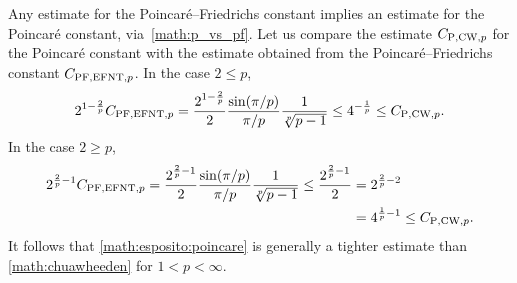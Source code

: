 \documentclass[10pt,letterpaper]{article}
\begin{document}
\begin{remark}
    Any estimate for the Poincar\'e--Friedrichs constant implies an estimate for the Poincar\'e constant, via~\eqref{math:p_vs_pf}. 
    Let us compare the estimate $C_{{\rm P},{\rm CW},p}$ for the Poincar\'e constant
    with the estimate obtained from the Poincar\'e--Friedrichs constant $C_{{\rm PF},{\rm EFNT},p}$. 
    In the case $2 \leq p$, 
    \begin{align*}
        2^{1-\frac 2 p}
        C_{{\rm PF},{\rm EFNT},p}
        =
        \frac{ 2^{1-\frac 2 p} }{2}
        \frac{ \sin(\pi/p) }{ \pi/p }
        \frac{ 1 }{ \sqrt[p]{p-1} }
        \leq 
        4^{-\frac 1 p}
        \leq
        C_{{\rm P},{\rm CW},p} 
        .
    \end{align*}
    In the case $2 \geq p$, 
    \begin{align*}
        2^{\frac 2 p - 1}
        C_{{\rm PF},{\rm EFNT},p}
        =
        \frac{ 2^{\frac 2 p - 1} }{2}
        \frac{ \sin(\pi/p) }{ \pi/p }
        \frac{ 1 }{ \sqrt[p]{p-1} }
        \leq
        \frac{ 2^{\frac 2 p-1} }{2}
        &
        =
        2^{\frac 2 p - 2}
        \\&
        =
        4^{\frac 1 p - 1}
        \leq
        C_{{\rm P},{\rm CW},p} 
        .
    \end{align*}
    It follows that \eqref{math:esposito:poincare} is generally a tighter estimate than \eqref{math:chuawheeden} for $1 < p < \infty$.

\end{remark}
\end{document}

